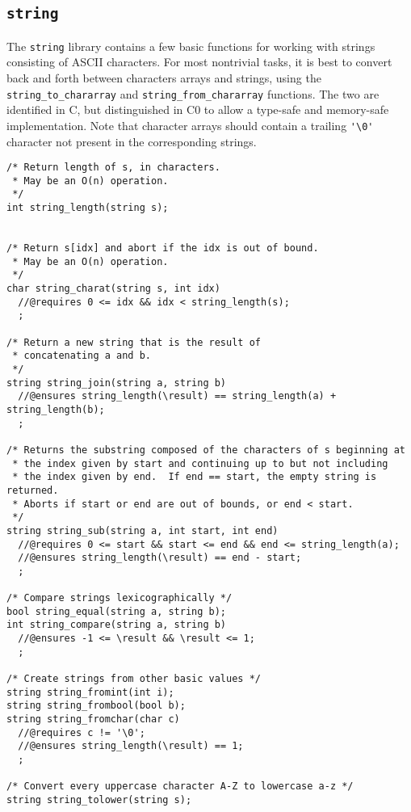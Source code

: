 \documentclass[11pt]{article}
\renewcommand{\_}{\char`\_}
\renewcommand{\{}{\char`\{}
\renewcommand{\}}{\char`\}}
\begin{document}
\clearpage
\subsection{\tt string}

The \verb'string' library contains a few basic functions for working
with strings consisting of ASCII characters.  For most nontrivial
tasks, it is best to convert back and forth between characters arrays
and strings, using the \verb'string_to_chararray' and
\verb'string_from_chararray' functions.  The two are identified in C,
but distinguished in C0 to allow a type-safe and memory-safe
implementation.  Note that character arrays should contain a trailing
\verb"'\0'" character not present in the corresponding strings.

\begin{small}
\begin{verbatim}
/* Return length of s, in characters.
 * May be an O(n) operation.
 */
int string_length(string s);  
         

/* Return s[idx] and abort if the idx is out of bound.
 * May be an O(n) operation.
 */
char string_charat(string s, int idx)
  //@requires 0 <= idx && idx < string_length(s);
  ;

/* Return a new string that is the result of
 * concatenating a and b.
 */
string string_join(string a, string b)
  //@ensures string_length(\result) == string_length(a) + string_length(b);
  ;

/* Returns the substring composed of the characters of s beginning at
 * the index given by start and continuing up to but not including
 * the index given by end.  If end == start, the empty string is returned.
 * Aborts if start or end are out of bounds, or end < start.
 */
string string_sub(string a, int start, int end)
  //@requires 0 <= start && start <= end && end <= string_length(a);
  //@ensures string_length(\result) == end - start;
  ;

/* Compare strings lexicographically */
bool string_equal(string a, string b);
int string_compare(string a, string b)
  //@ensures -1 <= \result && \result <= 1;
  ;

/* Create strings from other basic values */
string string_fromint(int i);
string string_frombool(bool b);
string string_fromchar(char c)
  //@requires c != '\0';
  //@ensures string_length(\result) == 1;
  ;

/* Convert every uppercase character A-Z to lowercase a-z */
string string_tolower(string s);


\end{verbatim}
\end{small}
\end{document}
